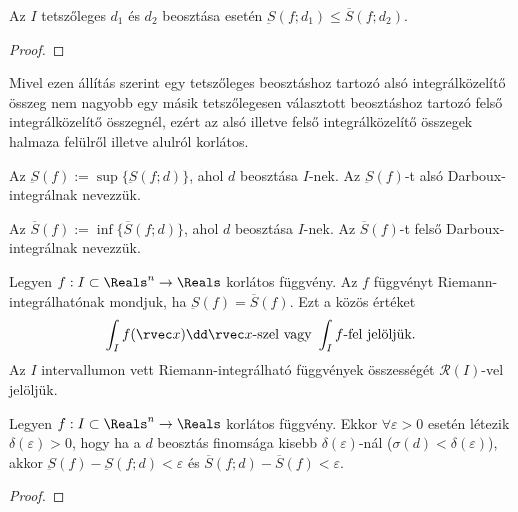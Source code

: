 \begin{statement}
  Az $I$ tetszőleges $d_1$ és $d_2$ beosztása esetén
  $\underbar S(f; d_1) \leq \overbar S(f; d_2)$.

  \begin{proof}
    \vspace{8em}
  \end{proof}
\end{statement}

\begin{note}
  Mivel ezen állítás szerint egy tetszőleges beosztáshoz tartozó alsó
  integrálközelítő összeg nem nagyobb egy másik tetszőlegesen választott
  beosztáshoz tartozó felső integrálközelítő összegnél, ezért az alsó illetve
  felső integrálközelítő összegek halmaza felülről illetve alulról korlátos.
\end{note}

\begin{definition}
  Az $\underbar S(f) := \sup \{ \underbar S(f; d) \}$, ahol $d$ beosztása
  $I$-nek. Az $\underbar S(f)$-t alsó Darboux-integrálnak nevezzük.

  Az $\overbar S(f) := \inf \{ \overbar S(f; d) \}$, ahol $d$ beosztása
  $I$-nek. Az $\overbar S(f)$-t felső Darboux-integrálnak nevezzük.
\end{definition}


\begin{definition}
  Legyen $f: I \subset \Reals^n \to \Reals$ korlátos függvény. Az $f$ függvényt
  Riemann-integrálhatónak mondjuk, ha $\underbar S(f) = \overbar S(f)$. Ezt a
  közös értéket
  $$
    \int_I f(\rvec x) \dd \rvec x
    \text{-szel vagy }
    \int_I f
    \text{-fel jelöljük.}
  $$
  Az $I$ intervallumon vett Riemann-integrálható függvények összességét
  $\mathcal R(I)$-vel jelöljük.
\end{definition}

\begin{theorem}
  Legyen $f: I \subset \Reals^n \to \Reals$ korlátos függvény. Ekkor
  $\forall \varepsilon > 0$ esetén létezik $\delta(\varepsilon) > 0$, hogy ha a
  $d$ beosztás finomsága kisebb $\delta(\varepsilon)$-nál
  ($\sigma(d) < \delta(\varepsilon)$), akkor
  $\underbar S(f) - \underbar S(f; d) < \varepsilon$ és
  $\overbar S(f; d) - \overbar S(f) < \varepsilon$.

  \begin{proof}
    \vspace{8em}
  \end{proof}
\end{theorem}

